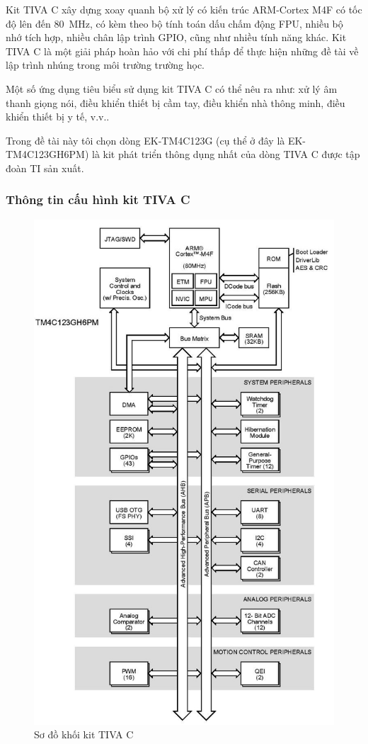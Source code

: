 Kit TIVA C xây dựng xoay quanh bộ xử lý có kiến trúc ARM-Cortex M4F có tốc độ lên đến \si{80\MHz}, có kèm theo bộ tính toán dấu chấm động FPU, nhiều bộ nhớ tích hợp, nhiều chân lập trình GPIO, cũng như nhiều tính năng khác.
Kit TIVA C là một giải pháp hoàn hảo với chi phí thấp để thực hiện những đề tài về lập trình nhúng trong môi trường trường học.

Một số ứng dụng tiêu biểu sử dụng kit TIVA C có thể nêu ra như: xử lý âm thanh giọng nói, điều khiển thiết bị cầm tay, điều khiển nhà thông minh, điều khiển thiết bị y tế, v.v..

Trong đề tài này tôi chọn dòng EK-TM4C123G (cụ thể ở đây là EK-TM4C123GH6PM) là kit phát triển thông dụng nhất của dòng TIVA C được tập đoàn TI sản xuất.

\subsubsection{Thông tin cấu hình kit TIVA C}
\begin{figure}[ht]
\centering
\includegraphics[scale=0.45]{images/tiva_c_diagram.jpg}
\caption{Sơ đồ khối kit TIVA C}
\end{figure}

